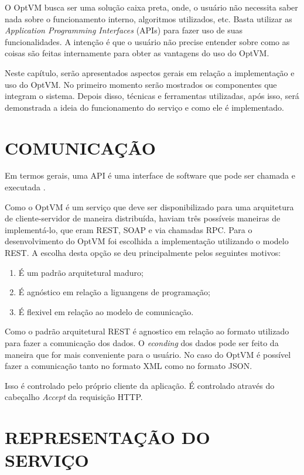 O OptVM busca ser uma solução caixa preta, onde, o usuário não necessita saber nada sobre o funcionamento interno, 
algoritmos utilizados, etc. Basta utilizar as \textit{Application Programming Interfaces} (APIs) para fazer uso de suas funcionalidades.
A intenção é que o usuário não precise entender sobre como as coisas são feitas internamente para obter as vantagens do uso do OptVM.

Neste capítulo, serão apresentados aspectos gerais em relação a implementação e uso do OptVM. 
No primeiro momento serão mostrados os componentes que integram o sistema. 
Depois disso, técnicas e ferramentas utilizadas, após isso, será demonstrada a ideia do funcionamento do serviço e como ele é
implementado.

\section{COMUNICAÇÃO}
Em termos gerais, uma API é uma interface de software que pode ser chamada e executada \cite{eizinger}. 

Como o OptVM é um serviço que deve ser disponibilizado para uma arquitetura de 
cliente-servidor de maneira distribuída, haviam três possíveis maneiras de implementá-lo, 
que eram REST, SOAP e via chamadas RPC. 
Para o desenvolvimento do OptVM foi escolhida a implementação utilizando o modelo REST. 
A escolha desta opção se deu principalmente pelos seguintes motivos:

\begin{enumerate}
\item É um padrão arquitetural maduro;
\item É agnóstico em relação a liguangens de programação;
\item É flexivel em relação ao modelo de comunicação.
\end{enumerate}

Como o padrão arquitetural REST é agnostico em relação ao formato utilizado para fazer a comunicação dos dados. O \textit{econding} 
dos dados pode ser feito da maneira que for mais conveniente para o usuário. No caso do OptVM é possível fazer a comunicação
tanto no formato XML como no formato JSON.

Isso é controlado pelo próprio cliente da aplicação. É controlado através do cabeçalho \textit{Accept}
da requisição HTTP.

\section{REPRESENTAÇÃO DO SERVIÇO}

